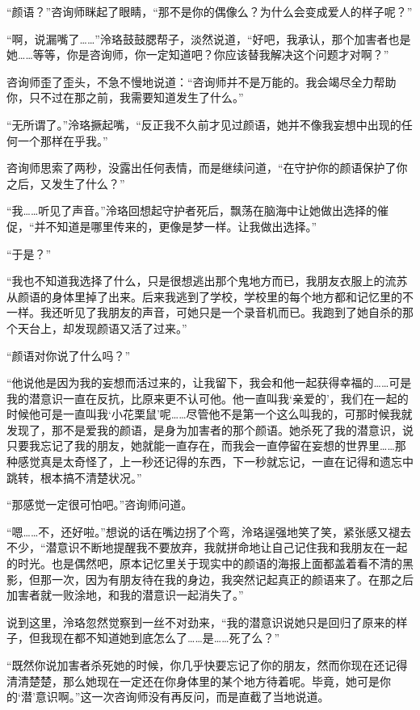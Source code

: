 \documentclass[UTF8, scheme = chinese, openany]{ctexbook}
\begin{document}
“颜语？”咨询师眯起了眼睛，“那不是你的偶像么？为什么会变成爱人的样子呢？”

“啊，说漏嘴了……”泠珞鼓鼓腮帮子，淡然说道，“好吧，我承认，那个加害者也是她……等等，你是咨询师，你一定知道吧？你应该替我解决这个问题才对啊？”

咨询师歪了歪头，不急不慢地说道：“咨询师并不是万能的。我会竭尽全力帮助你，只不过在那之前，我需要知道发生了什么。”

“无所谓了。”泠珞撅起嘴，“反正我不久前才见过颜语，她并不像我妄想中出现的任何一个那样在乎我。”

咨询师思索了两秒，没露出任何表情，而是继续问道，“在守护你的颜语保护了你之后，又发生了什么？”

“我……听见了声音。”泠珞回想起守护者死后，飘荡在脑海中让她做出选择的催促，“并不知道是哪里传来的，更像是梦一样。让我做出选择。”

“于是？”

“我也不知道我选择了什么，只是很想逃出那个鬼地方而已，我朋友衣服上的流苏从颜语的身体里掉了出来。后来我逃到了学校，学校里的每个地方都和记忆里的不一样。我还听见了我朋友的声音，可她只是一个录音机而已。我跑到了她自杀的那个天台上，却发现颜语又活了过来。”

“颜语对你说了什么吗？”

“他说他是因为我的妄想而活过来的，让我留下，我会和他一起获得幸福的……可是我的潜意识一直在反抗，比原来更不认可他。他一直叫我‘亲爱的’，我们在一起的时候他可是一直叫我‘小花栗鼠’呢……尽管他不是第一个这么叫我的，可那时候我就发现了，那不是爱我的颜语，是身为加害者的那个颜语。她杀死了我的潜意识，说只要我忘记了我的朋友，她就能一直存在，而我会一直停留在妄想的世界里……那种感觉真是太奇怪了，上一秒还记得的东西，下一秒就忘记，一直在记得和遗忘中跳转，根本搞不清楚状况。”

“那感觉一定很可怕吧。”咨询师问道。

“嗯……不，还好啦。”想说的话在嘴边拐了个弯，泠珞逞强地笑了笑，紧张感又褪去不少，“潜意识不断地提醒我不要放弃，我就拼命地让自己记住我和我朋友在一起的时光。也是偶然吧，原本记忆里关于现实中的颜语的海报上面都盖着看不清的黑影，但那一次，因为有朋友待在我的身边，我突然记起真正的颜语来了。在那之后加害者就一败涂地，和我的潜意识一起消失了。”

说到这里，泠珞忽然觉察到一丝不对劲来，“我的潜意识说她只是回归了原来的样子，但我现在都不知道她到底怎么了……是……死了么？”

“既然你说加害者杀死她的时候，你几乎快要忘记了你的朋友，然而你现在还记得清清楚楚，那么她现在一定还在你身体里的某个地方待着呢。毕竟，她可是你的‘潜’意识啊。”这一次咨询师没有再反问，而是直截了当地说道。
\end{document}
